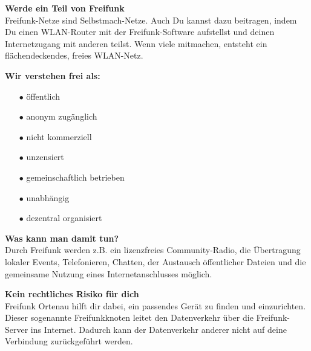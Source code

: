 \documentclass[a4paper]{article}
\begin{document}
\begin{Row}
    \begin{Cell}{5}
    \textbf{Werde ein Teil von Freifunk} \\
Freifunk-Netze sind Selbstmach-Netze. Auch Du kannst dazu beitragen, indem Du einen WLAN-Router mit der Freifunk-Software aufstellst und deinen Internetzugang mit anderen teilst. Wenn viele mitmachen, entsteht ein flächendeckendes, freies WLAN-Netz.
    \end{Cell}
    \begin{Cell}{4}
    \textbf{Wir verstehen frei als:} \vspace*{-0.18cm}
	\begin{itemize}
	   \item[\textcolor{freifunkpink}{\Large$\bullet$}] öffentlich \vspace*{-0.3cm}
	   \item[\textcolor{freifunkpink}{\Large$\bullet$}] anonym zugänglich \vspace*{-0.3cm}
	   \item[\textcolor{freifunkpink}{\Large$\bullet$}] nicht kommerziell \vspace*{-0.3cm}
	   \item[\textcolor{freifunkpink}{\Large$\bullet$}] unzensiert \vspace*{-0.3cm}
	   \item[\textcolor{freifunkpink}{\Large$\bullet$}] gemeinschaftlich betrieben\vspace*{-0.3cm}
	   \item[\textcolor{freifunkpink}{\Large$\bullet$}] unabhängig\vspace*{-0.3cm}
	   \item[\textcolor{freifunkpink}{\Large$\bullet$}] dezentral organisiert
	\end{itemize}
    \end{Cell}
\end{Row}
\newpage

\thispagestyle{empty}

\begin{Row}[cellsep=0.75cm]
    \begin{Cell}{4}
    \textbf{Was kann man damit tun?} \\
    Durch Freifunk werden z.B. ein lizenzfreies Community-Radio, die Übertragung lokaler Events, Telefonieren, Chatten, der Austausch öffentlicher Dateien und die gemeinsame Nutzung eines Internetanschlusses möglich.
    \end{Cell}
\begin{Cell}{5}
    \textbf{Kein rechtliches Risiko für dich} \\
Freifunk Ortenau hilft dir dabei, ein passendes Gerät zu finden und einzurichten. Dieser sogenannte Freifunkknoten leitet den Datenverkehr über die Freifunk-Server ins Internet. Dadurch kann der Datenverkehr anderer nicht auf deine Verbindung zurückgeführt werden.
\end{Cell}
\end{Row}
\end{document}
